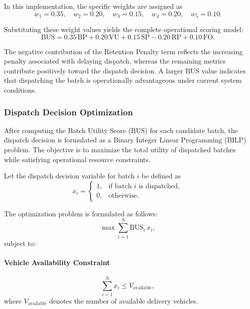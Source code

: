 \documentclass{article}
\begin{document}
In this implementation, the specific weights are assigned as
\begin{equation}
w_1 = 0.35, \quad w_2 = 0.20, \quad w_3 = 0.15, \quad w_4 = 0.20, \quad w_5 = 0.10.
\end{equation}

Substituting these weight values yields the complete operational scoring model:
\begin{equation}
\mathrm{BUS} = 0.35\,\mathrm{BP} + 0.20\,\mathrm{VU} + 0.15\,\mathrm{SP} - 0.20\,\mathrm{RP} + 0.10\,\mathrm{FO}.
\end{equation}

The negative contribution of the Retention Penalty term reflects the increasing penalty associated with delaying dispatch, whereas the remaining metrics contribute positively toward the dispatch decision. A larger $\mathrm{BUS}$ value indicates that dispatching the batch is operationally advantageous under current system conditions.

\subsubsection{Dispatch Decision Optimization}
\label{subsubsec:dispatch_decision_optimization}

After computing the Batch Utility Score ($\mathrm{BUS}$) for each candidate batch, the dispatch decision is formulated as a Binary Integer Linear Programming (BILP) problem. The objective is to maximize the total utility of dispatched batches while satisfying operational resource constraints.

Let the dispatch decision variable for batch $i$ be defined as
\begin{equation}
x_i = 
\begin{cases}
1, & \text{if batch } i \text{ is dispatched}, \\
0, & \text{otherwise}.
\end{cases}
\end{equation}

The optimization problem is formulated as follows:
\begin{equation}
\max \sum_{i=1}^{N} \mathrm{BUS}_i \, x_i,
\end{equation}
subject to:

\paragraph{Vehicle Availability Constraint}
\begin{equation}
\sum_{i=1}^{N} x_i \le V_{\mathrm{available}},
\end{equation}
where $V_{\mathrm{available}}$ denotes the number of available delivery vehicles.
\end{document}
